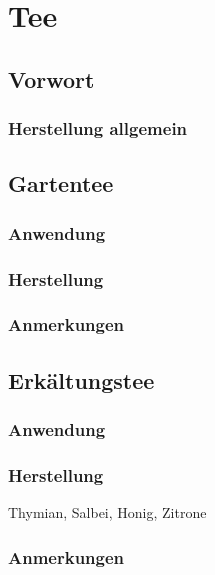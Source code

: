 \chapter{Tee}


\section{Vorwort}


\subsection{Herstellung allgemein}



\section{Gartentee}

\subsection{Anwendung}

\subsection{Herstellung}

\subsection{Anmerkungen}




\section{Erkältungstee}

\subsection{Anwendung}

\subsection{Herstellung}

Thymian, Salbei, Honig, Zitrone


\subsection{Anmerkungen}



